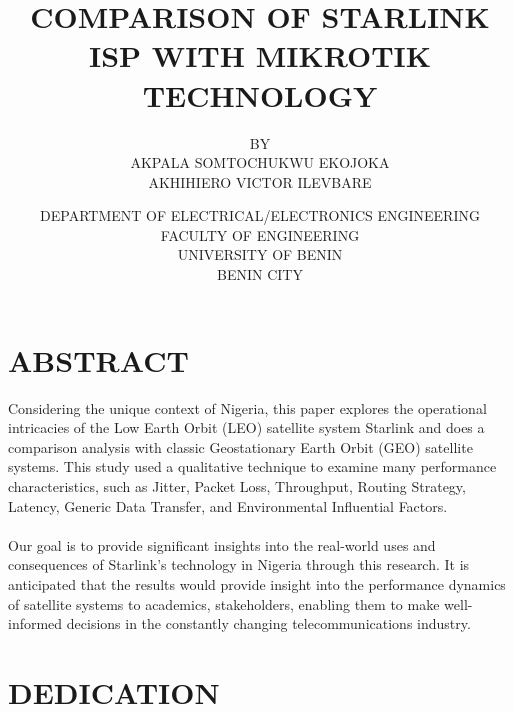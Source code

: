 \documentclass[a4paper, 12pt]{report}
\title{COMPARISON OF STARLINK ISP WITH MIKROTIK TECHNOLOGY}
\author{BY \\
		AKPALA SOMTOCHUKWU EKOJOKA\\
		AKHIHIERO VICTOR ILEVBARE}
\date{DEPARTMENT OF ELECTRICAL/ELECTRONICS ENGINEERING\\
FACULTY OF ENGINEERING\\
UNIVERSITY OF BENIN\\
BENIN CITY}
\begin{document}
\maketitle
\chapter*{ABSTRACT}
Considering the unique context of Nigeria, this paper explores the operational intricacies of the Low Earth Orbit (LEO) satellite system Starlink and does a comparison analysis with classic Geostationary Earth Orbit (GEO) satellite systems. This study used a qualitative technique to examine many performance characteristics, such as Jitter, Packet Loss, Throughput, Routing Strategy, Latency, Generic Data Transfer, and Environmental Influential Factors.\\ \\
Our goal is to provide significant insights into the real-world uses and consequences of Starlink's technology in Nigeria through this research. It is anticipated that the results would provide insight into the performance dynamics of satellite systems to academics, stakeholders, enabling them to make well-informed decisions in the constantly changing telecommunications industry.

\chapter*{DEDICATION}
\begin{doublespacing}

\end{doublespacing}


\end{document}
